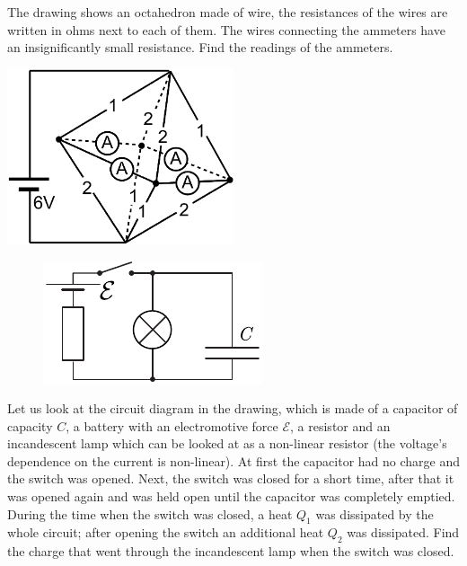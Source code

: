 \documentclass[11pt]{article}
\begin{document}
\probeng
The drawing shows an octahedron made of wire, the resistances of the wires are written in ohms next to each of them. The wires connecting the ammeters have an insignificantly small resistance. Find the readings of the ammeters.
\begin{center}
\includegraphics[width=0.5\textwidth]{2016-lahg-08-ampermeeterjoonis}
\end{center}
\probend
\bigskip


\probeng
\begin{figure}
\vspace{-10pt}
\begin{center}
\includegraphics[width=\linewidth]{2018-v3g-09-LC-Q}
\par\end{center} 
\end{figure}
Let us look at the circuit diagram in the drawing, which is made of a capacitor of capacity $C$, a battery with an electromotive force $\mathcal{E}$, a resistor and an incandescent lamp which can be looked at as a non-linear resistor (the voltage’s dependence on the current is non-linear). At first the capacitor had no charge and the switch was opened. Next, the switch was closed for a short time, after that it was opened again and was held open until the capacitor was completely emptied. During the time when the switch was closed, a heat $Q_1$ was dissipated by the whole circuit; after opening the switch an additional heat $Q_2$ was dissipated. Find the charge that went through the incandescent lamp when the switch was closed.
\probend
\bigskip
\end{document}
